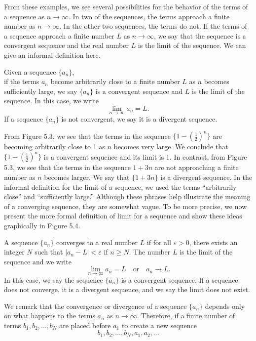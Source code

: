 \documentclass{report}
\begin{document}
    \bigbreak \noindent 
    From these examples, we see several possibilities for the behavior of the terms of a sequence as \( n \to \infty \). 
    In two of the sequences, the terms approach a finite number as \( n \to \infty \). 
    In the other two sequences, the terms do not. If the terms of a sequence approach a finite number \( L \) as \( n \to \infty \), 
    we say that the sequence is a convergent sequence and the real number \( L \) is the limit of the sequence. We can give an informal definition here.
    \bigbreak \noindent 
    \begin{definition}
        Given a sequence \( \{a_n\} \), \\
        if the terms \( a_n \) become arbitrarily close to a finite number \( L \) as \( n \) becomes sufficiently large, we say \( \{a_n\} \) is a convergent sequence and \( L \) is the limit of the sequence. In this case, we write \\
        \[
        \lim_{{n \to \infty}} a_n = L.
        \]
        If a sequence \( \{a_n\} \) is not convergent, we say it is a divergent sequence.
    \end{definition}

    \bigbreak \noindent 
    From Figure 5.3, we see that the terms in the sequence \( \{1-\left(\frac{1}{2}\right)^{n}\} \) are becoming arbitrarily close to 1 as \( n \) becomes very large. We conclude that \( \{1-\left(\frac{1}{2}\right)^{n}\} \) is a convergent sequence and its limit is 1. In contrast, from Figure 5.3, we see that the terms in the sequence \( 1+3n \) are not approaching a finite number as \( n \) becomes larger. We say that \( \{1+3n\} \) is a divergent sequence.
    \bigbreak \noindent 
    In the informal definition for the limit of a sequence, we used the terms “arbitrarily close” and “sufficiently large.” Although these phrases help illustrate the meaning of a converging sequence, they are somewhat vague. To be more precise, we now present the more formal definition of limit for a sequence and show these ideas graphically in Figure 5.4.
    \bigbreak \noindent 
    \begin{definition}
        A sequence \( \{a_n\} \) converges to a real number \( L \) if for all \( \varepsilon > 0 \), there exists an integer \( N \) such that \( |a_n - L| < \varepsilon \) if \( n \geq N \). The number \( L \) is the limit of the sequence and we write
        \[
        \lim_{{n \to \infty}} a_n = L \quad \text{or} \quad a_n \to L.
        \]
        In this case, we say the sequence \( \{a_n\} \) is a convergent sequence. If a sequence does not converge, it is a divergent sequence, and we say the limit does not exist.
    \end{definition}
    \bigbreak \noindent 
    We remark that the convergence or divergence of a sequence \( \{a_n\} \) depends only on what happens to the terms \( a_n \) as \( n \to \infty \). Therefore, if a finite number of terms \( b_1, b_2, \ldots, b_N \) are placed before \( a_1 \) to create a new sequence
    \[ b_1, b_2, \ldots, b_N, a_1, a_2, \ldots \]
    
\end{document}
